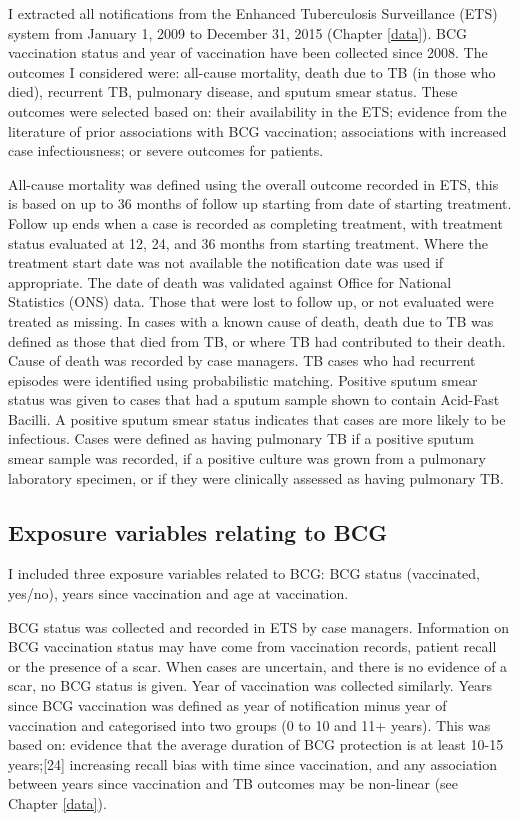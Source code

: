 \documentclass[11pt,twoside]{bristolthesis}
\begin{document}
  I extracted all notifications from the Enhanced Tuberculosis Surveillance (ETS) system from January 1, 2009 to December 31, 2015 (Chapter \ref{data}). BCG vaccination status and year of vaccination have been collected since 2008. The outcomes I considered were: all-cause mortality, death due to TB (in those who died), recurrent TB, pulmonary disease, and sputum smear status. These outcomes were selected based on: their availability in the ETS; evidence from the literature of prior associations with BCG vaccination; associations with increased case infectiousness; or severe outcomes for patients.
  
  All-cause mortality was defined using the overall outcome recorded in ETS, this is based on up to 36 months of follow up starting from date of starting treatment. Follow up ends when a case is recorded as completing treatment, with treatment status evaluated at 12, 24, and 36 months from starting treatment. Where the treatment start date was not available the notification date was used if appropriate. The date of death was validated against Office for National Statistics (ONS) data. Those that were lost to follow up, or not evaluated were treated as missing. In cases with a known cause of death, death due to TB was defined as those that died from TB, or where TB had contributed to their death. Cause of death was recorded by case managers. TB cases who had recurrent episodes were identified using probabilistic matching. Positive sputum smear status was given to cases that had a sputum sample shown to contain Acid-Fast Bacilli. A positive sputum smear status indicates that cases are more likely to be infectious. Cases were defined as having pulmonary TB if a positive sputum smear sample was recorded, if a positive culture was grown from a pulmonary laboratory specimen, or if they were clinically assessed as having pulmonary TB.
  
  \hypertarget{exposure-variables-relating-to-bcg}{%
  \subsection{Exposure variables relating to BCG}\label{exposure-variables-relating-to-bcg}}
  
  I included three exposure variables related to BCG: BCG status (vaccinated, yes/no), years since vaccination and age at vaccination.
  
  BCG status was collected and recorded in ETS by case managers. Information on BCG vaccination status may have come from vaccination records, patient recall or the presence of a scar. When cases are uncertain, and there is no evidence of a scar, no BCG status is given. Year of vaccination was collected similarly. Years since BCG vaccination was defined as year of notification minus year of vaccination and categorised into two groups (0 to 10 and 11+ years). This was based on: evidence that the average duration of BCG protection is at least 10-15 years;{[}24{]} increasing recall bias with time since vaccination, and any association between years since vaccination and TB outcomes may be non-linear (see Chapter \ref{data}).
  
\end{document}
